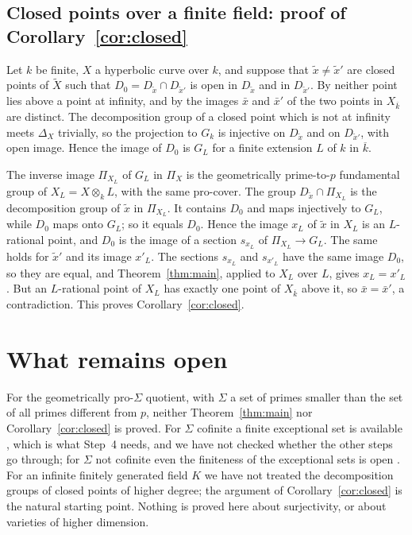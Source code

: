 \documentclass[11pt]{amsart}
\theoremstyle{remark}
\begin{document}
\subsection{Closed points over a finite field: proof of Corollary~\ref{cor:closed}}
Let $k$ be finite, $X$ a hyperbolic curve over $k$, and suppose that $\tilde x\ne\tilde x'$ are closed points of $\widetilde X$ such that $D_0=D_{\tilde x}\cap D_{\tilde x'}$ is open in $D_{\tilde x}$ and in $D_{\tilde x'}$. By \cite[Proposition 1.8(ii)]{ST09} neither point lies above a point at infinity, and by \cite[Proposition 1.8(iii)]{ST09} the images $\bar x$ and $\bar x'$ of the two points in $X_{\overline k}$ are distinct. The decomposition group of a closed point which is not at infinity meets $\Delta_X$ trivially, so the projection to $G_k$ is injective on $D_{\tilde x}$ and on $D_{\tilde x'}$, with open image. Hence the image of $D_0$ is $G_L$ for a finite extension $L$ of $k$ in $\overline k$.

The inverse image $\Pi_{X_L}$ of $G_L$ in $\Pi_X$ is the geometrically prime-to-$p$ fundamental group of $X_L=X\otimes_kL$, with the same pro-cover. The group $D_{\tilde x}\cap\Pi_{X_L}$ is the decomposition group of $\tilde x$ in $\Pi_{X_L}$. It contains $D_0$ and maps injectively to $G_L$, while $D_0$ maps onto $G_L$; so it equals $D_0$. Hence the image $x_L$ of $\tilde x$ in $X_L$ is an $L$-rational point, and $D_0$ is the image of a section $s_{x_L}$ of $\Pi_{X_L}\to G_L$. The same holds for $\tilde x'$ and its image $x'_L$. The sections $s_{x_L}$ and $s_{x'_L}$ have the same image $D_0$, so they are equal, and Theorem~\ref{thm:main}, applied to $X_L$ over $L$, gives $x_L=x'_L$. But an $L$-rational point of $X_L$ has exactly one point of $X_{\overline k}$ above it, so $\bar x=\bar x'$, a contradiction. This proves Corollary~\ref{cor:closed}.

\section{What remains open}
For the geometrically pro-$\Sigma$ quotient, with $\Sigma$ a set of primes smaller than the set of all primes different from $p$, neither Theorem~\ref{thm:main} nor Corollary~\ref{cor:closed} is proved. For $\Sigma$ cofinite a finite exceptional set is available \cite[Proposition 1.8(vi)]{ST09}, which is what Step~4 needs, and we have not checked whether the other steps go through; for $\Sigma$ not cofinite even the finiteness of the exceptional sets is open \cite[Introduction, pp.~4--5]{ST18}. For an infinite finitely generated field $K$ we have not treated the decomposition groups of closed points of higher degree; the argument of Corollary~\ref{cor:closed} is the natural starting point. Nothing is proved here about surjectivity, or about varieties of higher dimension.
\end{document}
